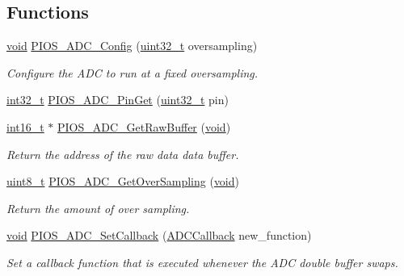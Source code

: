 \subsection*{Functions}
\begin{DoxyCompactItemize}
\item 
\hyperlink{group___n_a_m_e_ga18028b8badbf1ea7e704ccac3c488e82}{void} \hyperlink{group___p_i_o_s___a_d_c_ga0edf09afa78da740bb49069ee8221b5c}{P\-I\-O\-S\-\_\-\-A\-D\-C\-\_\-\-Config} (\hyperlink{stdint_8h_a435d1572bf3f880d55459d9805097f62}{uint32\-\_\-t} oversampling)
\begin{DoxyCompactList}\small\item\em Configure the A\-D\-C to run at a fixed oversampling. \end{DoxyCompactList}\item 
\hyperlink{group___n_a_m_e_gafd12020da5a235dfcf0c3c748fb5baed}{int32\-\_\-t} \hyperlink{group___p_i_o_s___a_d_c_ga014bdd5e97b33f0e3eb9b8b4318a8586}{P\-I\-O\-S\-\_\-\-A\-D\-C\-\_\-\-Pin\-Get} (\hyperlink{stdint_8h_a435d1572bf3f880d55459d9805097f62}{uint32\-\_\-t} pin)
\item 
\hyperlink{stdint_8h_aa343fa3b3d06292b959ffdd4c4703b06}{int16\-\_\-t} $\ast$ \hyperlink{group___p_i_o_s___a_d_c_ga8f65053761f8ff493734b8105528a3ab}{P\-I\-O\-S\-\_\-\-A\-D\-C\-\_\-\-Get\-Raw\-Buffer} (\hyperlink{group___n_a_m_e_ga18028b8badbf1ea7e704ccac3c488e82}{void})
\begin{DoxyCompactList}\small\item\em Return the address of the raw data data buffer. \end{DoxyCompactList}\item 
\hyperlink{stdint_8h_aba7bc1797add20fe3efdf37ced1182c5}{uint8\-\_\-t} \hyperlink{group___p_i_o_s___a_d_c_gaa343a6f620ddd80259e92ff0595cf977}{P\-I\-O\-S\-\_\-\-A\-D\-C\-\_\-\-Get\-Over\-Sampling} (\hyperlink{group___n_a_m_e_ga18028b8badbf1ea7e704ccac3c488e82}{void})
\begin{DoxyCompactList}\small\item\em Return the amount of over sampling. \end{DoxyCompactList}\item 
\hyperlink{group___n_a_m_e_ga18028b8badbf1ea7e704ccac3c488e82}{void} \hyperlink{group___p_i_o_s___a_d_c_gaba0959952db7ff67364a28ea801c41ec}{P\-I\-O\-S\-\_\-\-A\-D\-C\-\_\-\-Set\-Callback} (\hyperlink{group___p_i_o_s___a_d_c_ga20bf90833813c2c4945fab90c8e4f386}{A\-D\-C\-Callback} new\-\_\-function)
\begin{DoxyCompactList}\small\item\em Set a callback function that is executed whenever the A\-D\-C double buffer swaps. \end{DoxyCompactList}\item 

\end{DoxyCompactItemize}
